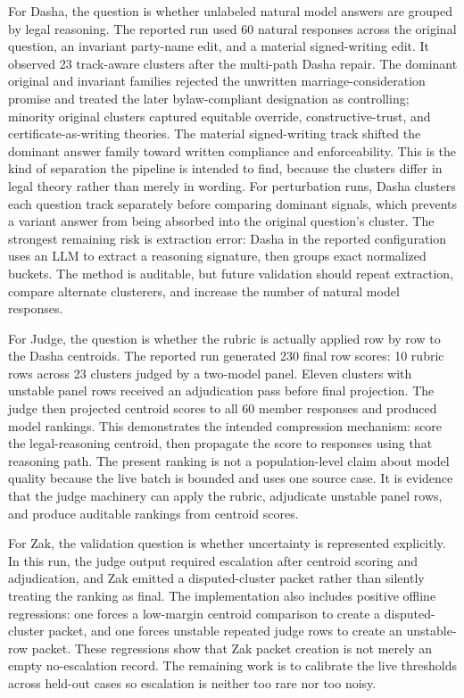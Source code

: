 For Dasha, the question is whether unlabeled natural model answers are grouped
by legal reasoning. The reported run used 60 natural responses across the
original question, an invariant party-name edit, and a material signed-writing
edit. It observed 23 track-aware clusters after the multi-path Dasha repair. The dominant original and invariant
families rejected the unwritten marriage-consideration promise and treated the
later bylaw-compliant designation as controlling; minority original clusters
captured equitable override, constructive-trust, and certificate-as-writing
theories. The material signed-writing track shifted the dominant answer family
toward written compliance and enforceability. This is the kind of separation
the pipeline is intended to find, because the clusters differ in legal theory
rather than merely in wording. For perturbation runs, Dasha clusters each
question track separately before comparing dominant signals, which prevents a
variant answer from being absorbed into the original question's cluster. The strongest
remaining risk is extraction error: Dasha in the reported configuration uses an LLM to extract a
reasoning signature, then groups exact normalized buckets. The method is
auditable, but future validation should repeat extraction, compare alternate
clusterers, and increase the number of natural model responses.

For Judge, the question is whether the rubric is actually applied row by row to
the Dasha centroids. The reported run generated 230 final row scores: 10 rubric
rows across 23 clusters judged by a two-model panel. Eleven clusters with unstable
panel rows received an adjudication pass before final projection. The judge then
projected centroid scores to all 60 member responses and produced model
rankings. This demonstrates the intended
compression mechanism: score the legal-reasoning centroid, then propagate the
score to responses using that reasoning path. The present ranking is not a
population-level claim about model quality because the live batch is bounded
and uses one source case. It is evidence that the judge machinery can apply the
rubric, adjudicate unstable panel rows, and produce auditable rankings from
centroid scores.

For Zak, the validation question is whether uncertainty is represented
explicitly. In this run, the judge output required escalation after centroid
scoring and adjudication, and Zak emitted a disputed-cluster packet rather than
silently treating the ranking as final. The implementation also includes
positive offline regressions: one forces a low-margin centroid comparison to
create a disputed-cluster packet, and one forces unstable repeated judge rows to
create an unstable-row packet. These regressions show that Zak packet creation
is not merely an empty no-escalation record. The remaining work is to calibrate
the live thresholds across held-out cases so escalation is neither too rare nor
too noisy.

